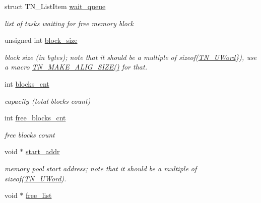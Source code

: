 \begin{DoxyCompactItemize}
\item 
\hypertarget{structTN__FMem_a63b47b05e191f4339509eef97027ca1c}{struct T\+N\+\_\+\+List\+Item \hyperlink{structTN__FMem_a63b47b05e191f4339509eef97027ca1c}{wait\+\_\+queue}}\label{structTN__FMem_a63b47b05e191f4339509eef97027ca1c}

\begin{DoxyCompactList}\small\item\em list of tasks waiting for free memory block \end{DoxyCompactList}\item 
unsigned int \hyperlink{structTN__FMem_a101e3e0eeb2774309a55ed1d6cad8e3f}{block\+\_\+size}
\begin{DoxyCompactList}\small\item\em block size (in bytes); note that it should be a multiple of {\ttfamily sizeof(\hyperlink{tn__arch__example_8h_ab80cba0fe9ffcd9011d53dfeb9e39bf4}{T\+N\+\_\+\+U\+Word}\})}, use a macro {\ttfamily \hyperlink{tn__common_8h_a3f48380e8a624edc643319a81192d88e}{T\+N\+\_\+\+M\+A\+K\+E\+\_\+\+A\+L\+I\+G\+\_\+\+S\+I\+Z\+E()}} for that. \end{DoxyCompactList}\item 
\hypertarget{structTN__FMem_a8c8bb7a3ac8228a865bbbea1edde9ea0}{int \hyperlink{structTN__FMem_a8c8bb7a3ac8228a865bbbea1edde9ea0}{blocks\+\_\+cnt}}\label{structTN__FMem_a8c8bb7a3ac8228a865bbbea1edde9ea0}

\begin{DoxyCompactList}\small\item\em capacity (total blocks count) \end{DoxyCompactList}\item 
\hypertarget{structTN__FMem_abf2618d6322b1339d7b3d60c6e080cb1}{int \hyperlink{structTN__FMem_abf2618d6322b1339d7b3d60c6e080cb1}{free\+\_\+blocks\+\_\+cnt}}\label{structTN__FMem_abf2618d6322b1339d7b3d60c6e080cb1}

\begin{DoxyCompactList}\small\item\em free blocks count \end{DoxyCompactList}\item 
void $\ast$ \hyperlink{structTN__FMem_a7eac768da37c99efd90ae56ebde527cf}{start\+\_\+addr}
\begin{DoxyCompactList}\small\item\em memory pool start address; note that it should be a multiple of {\ttfamily sizeof(\hyperlink{tn__arch__example_8h_ab80cba0fe9ffcd9011d53dfeb9e39bf4}{T\+N\+\_\+\+U\+Word})}. \end{DoxyCompactList}\item 
\hypertarget{structTN__FMem_a00ffa3c416a57946d95ab8814168eedb}{void $\ast$ \hyperlink{structTN__FMem_a00ffa3c416a57946d95ab8814168eedb}{free\+\_\+list}}\label{structTN__FMem_a00ffa3c416a57946d95ab8814168eedb}


\end{DoxyCompactItemize}
